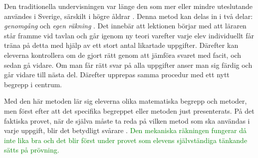 
\textcolor{lila}{Den traditionella undervisningen var länge den som mer eller mindre uteslutande användes i Sverige, särskilt i högre åldrar \cite{Namnaren}. Denna metod kan delas in i två delar: \textsl{genomgång} och \textsl{egen räkning} \cite{traditionellMatte}. Det innebär att lektionen börjar med att läraren står framme vid tavlan och går igenom ny teori varefter varje elev individuellt får träna på detta med hjälp av ett stort antal likartade uppgifter. Därefter kan eleverna kontrollera om de gjort rätt genom att jämföra svaret med facit, och sedan gå vidare. Om man får rätt svar på alla uppgifter anser man sig färdig och går vidare till nästa del. Därefter upprepas samma procedur med ett nytt begrepp i centrum.} 
    
\textcolor{lila}{Med den här metoden lär sig eleverna olika matematiska begrepp och metoder, men först efter att det specifika begreppet eller metoden just presenterats. På det faktiska provet, när de själva måste ta reda på vilken metod som ska användas i varje uppgift, blir det betydligt svårare \cite{TheElephant}.}
\textcolor{green}{
    Den mekaniska räkningen fungerar då inte lika bra och det blir först under provet som elevens självständiga tänkande sätts på prövning.}
    


